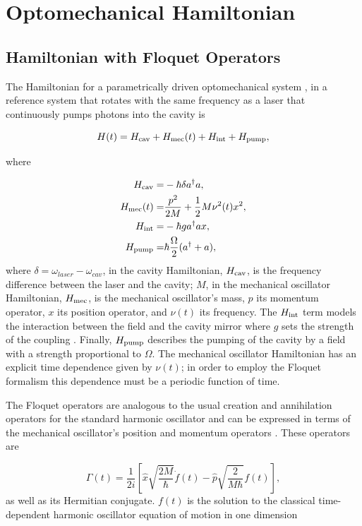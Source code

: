 \documentclass[reprint, amsmath,amssymb, aps,pra]{revtex4-1}
\begin{document}
\section{Optomechanical Hamiltonian}\label{OptmechH}
\subsection{Hamiltonian with Floquet Operators}
	
The Hamiltonian for a parametrically driven optomechanical system
\cite{LCNooshi}, in a reference system that rotates with the same
frequency as a laser that continuously pumps photons into the cavity
is

\begin{equation}
H(t) =   H_{\rm cav} + H_{\rm mec}(t) + H_{\rm int} + H_{\rm pump},
\end{equation}

where

\begin{align}
H_{\rm cav} =& -\hbar \delta a^\dagger a,\\
H_{\rm mec}(t) =& \frac{p^2}{2M} + \frac{1}{2}M \nu^2 (t) x^2,\\
H_{\rm int} =& -\hbar g a^\dagger a x,\\
H_{\rm pump} =& \hbar\frac{\Omega}{2}(a^\dagger + a),
\end{align}
where $\delta = \omega_{laser} - \omega_{cav}$, in the cavity Hamiltonian, $H_{\rm cav}$, is the frequency difference between the laser and
the cavity; $M$, in the mechanical oscillator Hamiltonian,
$H_{\rm mec}$, is the mechanical oscillator's mass, $p$ its momentum
operator, $x$ its position operator, and $\nu(t)$ its frequency. The
$H_{\rm int}$ term models the interaction between the field and the cavity
mirror where $g$ sets the strength of the coupling \cite{KippenberCO}.
Finally, $H_{\rm pump}$ describes the pumping of the cavity by a field with
a strength proportional to $\Omega$. The mechanical oscillator Hamiltonian has an explicit time dependence given by
$\nu(t)$; in order to employ the Floquet formalism this dependence must be a
periodic function of time.

The Floquet operators are analogous to the usual creation and
annihilation operators for the standard harmonic oscillator and can be
expressed in terms of the mechanical oscillator's position and
momentum operators \cite{HanngiFM}. These operators are

\begin{equation}\label{FloquetOperators}
\Gamma(t) = \frac{1}{2i}\left[\hat{x}\sqrt{\frac{2M}{\hbar}}\dot{f}(t)-\hat{p}\sqrt{\frac{2}{M \hbar }}f(t)\right],
\end{equation} as well as its Hermitian conjugate. $f(t)$ is the solution to the classical time-dependent harmonic oscillator equation of motion in one dimension 
\end{document}
